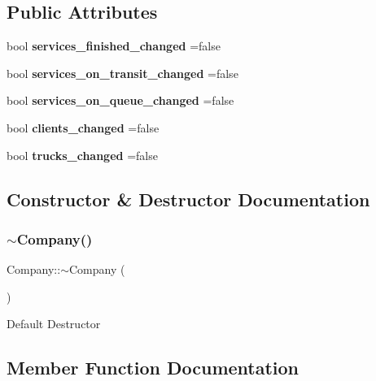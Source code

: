 \subsection*{Public Attributes}
\begin{DoxyCompactItemize}
\item 
\mbox{\label{class_company_a0671d8c8afcbe73e5719eac7db205859}} 
bool {\bfseries services\+\_\+finished\+\_\+changed} =false
\item 
\mbox{\label{class_company_aeac99d209136e732106bc0a3dad7d5d1}} 
bool {\bfseries services\+\_\+on\+\_\+transit\+\_\+changed} =false
\item 
\mbox{\label{class_company_a7f986eaf19517385d257ecf74a1a970a}} 
bool {\bfseries services\+\_\+on\+\_\+queue\+\_\+changed} =false
\item 
\mbox{\label{class_company_ab565013c5770e9ac94cc7f2875917f45}} 
bool {\bfseries clients\+\_\+changed} =false
\item 
\mbox{\label{class_company_ae9ee930a4a92e6f048960e486d2783dd}} 
bool {\bfseries trucks\+\_\+changed} =false
\end{DoxyCompactItemize}


\subsection{Constructor \& Destructor Documentation}
\mbox{\label{class_company_a61c2a9ec178e683310583ef15635b53c}} 
\subsubsection{\texorpdfstring{$\sim$\+Company()}{~Company()}}
{\footnotesize\ttfamily Company\+::$\sim$\+Company (\begin{DoxyParamCaption}{ }\end{DoxyParamCaption})}

Default Destructor 

\subsection{Member Function Documentation}
\mbox{\label{class_company_ae8efdaf521467fd204c8d272f4469679}} 
